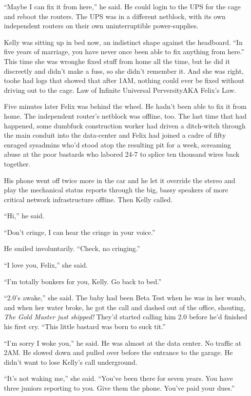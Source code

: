“Maybe I can fix it from here,” he said. He could login to the UPS
for the cage and reboot the routers. The UPS was in a different
netblock, with its own independent routers on their own
uninterruptible power-supplies.

Kelly was sitting up in bed now, an indistinct shape against the
headboard. “In five years of marriage, you have never once been
able to fix anything from here.” This time she was wrong\dash{}he fixed
stuff from home all the time, but he did it discreetly and didn’t
make a fuss, so she didn’t remember it. And she was right, too\dash{}he
had logs that showed that after 1AM, nothing could ever be fixed
without driving out to the cage. Law of Infinite Universal
Perversity\dash{}AKA Felix’s Law.

Five minutes later Felix was behind the wheel. He hadn’t been able
to fix it from home. The independent router’s netblock was offline,
too. The last time that had happened, some dumbfuck construction
worker had driven a ditch-witch through the main conduit into the
data-center and Felix had joined a cadre of fifty enraged sysadmins
who’d stood atop the resulting pit for a week, screaming abuse at
the poor bastards who labored 24-7 to splice ten thousand wires
back together.

His phone went off twice more in the car and he let it override the
stereo and play the mechanical status reports through the big,
bassy speakers of more critical network infrastructure offline.
Then Kelly called.

“Hi,” he said.

“Don’t cringe, I can hear the cringe in your voice.”

He smiled involuntarily. “Check, no cringing.”

“I love you, Felix,” she said.

“I’m totally bonkers for you, Kelly. Go back to bed.”

“2.0’s awake,” she said. The baby had been Beta Test when he was in
her womb, and when her water broke, he got the call and dashed out
of the office, shouting, \emph{The Gold Master just shipped!}
They’d started calling him 2.0 before he’d finished his first cry.
“This little bastard was born to suck tit.”

“I’m sorry I woke you,” he said. He was almost at the data center.
No traffic at 2AM. He slowed down and pulled over before the
entrance to the garage. He didn’t want to lose Kelly’s call
underground.

“It’s not waking me,” she said. “You’ve been there for seven years.
You have three juniors reporting to you. Give them the phone.
You’ve paid your dues.”

